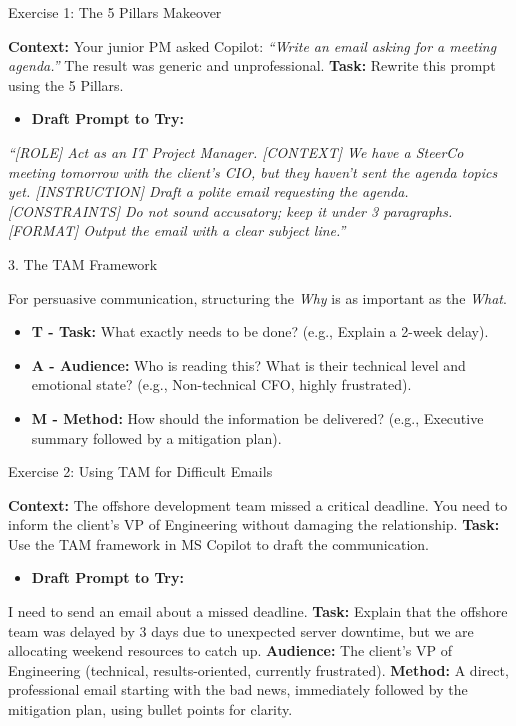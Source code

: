 \documentclass[aspectratio=169]{beamer}
\begin{document}
\begin{frame}[fragile]{Exercise 1: The 5 Pillars Makeover}


\textbf{Context:} Your junior PM asked Copilot: \textit{``Write an email asking for a meeting agenda.''} The result was generic and unprofessional.
\textbf{Task:} Rewrite this prompt using the 5 Pillars.

\begin{itemize}
  \item \textbf{Draft Prompt to Try:}
\end{itemize}
\textit{``[ROLE] Act as an IT Project Manager. [CONTEXT] We have a SteerCo meeting tomorrow with the client's CIO, but they haven't sent the agenda topics yet. [INSTRUCTION] Draft a polite email requesting the agenda. [CONSTRAINTS] Do not sound accusatory; keep it under 3 paragraphs. [FORMAT] Output the email with a clear subject line.''}

\end{frame}



\begin{frame}[fragile]{3. The TAM Framework}


For persuasive communication, structuring the \textit{Why} is as important as the \textit{What}.

\begin{itemize}
  \item \textbf{T - Task:} What exactly needs to be done? (e.g., Explain a 2-week delay).
  \item \textbf{A - Audience:} Who is reading this? What is their technical level and emotional state? (e.g., Non-technical CFO, highly frustrated).
  \item \textbf{M - Method:} How should the information be delivered? (e.g., Executive summary followed by a mitigation plan).
\end{itemize}
\end{frame}



\begin{frame}[fragile]{Exercise 2: Using TAM for Difficult Emails}


\textbf{Context:} The offshore development team missed a critical deadline. You need to inform the client's VP of Engineering without damaging the relationship.
\textbf{Task:} Use the TAM framework in MS Copilot to draft the communication.

\begin{itemize}
  \item \textbf{Draft Prompt to Try:}
\end{itemize}
I need to send an email about a missed deadline.
\textbf{Task:} Explain that the offshore team was delayed by 3 days due to unexpected server downtime, but we are allocating weekend resources to catch up.
\textbf{Audience:} The client's VP of Engineering (technical, results-oriented, currently frustrated).
\textbf{Method:} A direct, professional email starting with the bad news, immediately followed by the mitigation plan, using bullet points for clarity.

\end{frame}
\end{document}
